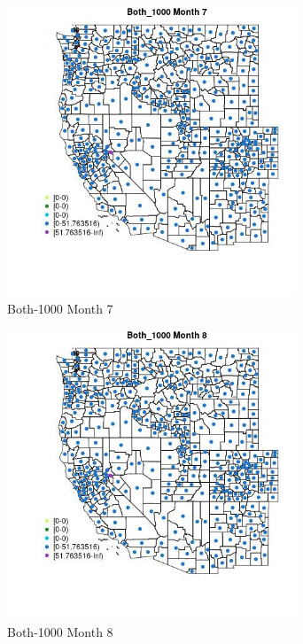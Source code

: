 \begin{figure} 
\centering  
\includegraphics[width=0.77\textwidth]{Code_Outputs/df_report_ML_predictors_CountyCentroid_Locations_Dates_2008-01-01to2018-12-31_MapObsMo7Both_1000.jpg} 
\caption{\label{fig:df_report_ML_predictors_CountyCentroid_Locations_Dates_2008-01-01to2018-12-31MapObsMo7Both_1000}Both-1000 Month 7} 
\end{figure} 
 

\begin{figure} 
\centering  
\includegraphics[width=0.77\textwidth]{Code_Outputs/df_report_ML_predictors_CountyCentroid_Locations_Dates_2008-01-01to2018-12-31_MapObsMo8Both_1000.jpg} 
\caption{\label{fig:df_report_ML_predictors_CountyCentroid_Locations_Dates_2008-01-01to2018-12-31MapObsMo8Both_1000}Both-1000 Month 8} 
\end{figure} 
 

